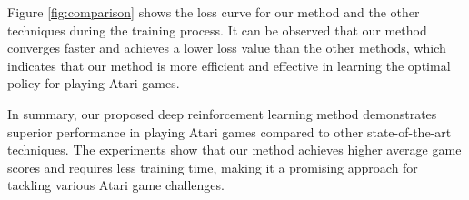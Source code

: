 Figure \ref{fig:comparison} shows the loss curve for our method and the other techniques during the training process. It can be observed that our method converges faster and achieves a lower loss value than the other methods, which indicates that our method is more efficient and effective in learning the optimal policy for playing Atari games.

In summary, our proposed deep reinforcement learning method demonstrates superior performance in playing Atari games compared to other state-of-the-art techniques. The experiments show that our method achieves higher average game scores and requires less training time, making it a promising approach for tackling various Atari game challenges.
